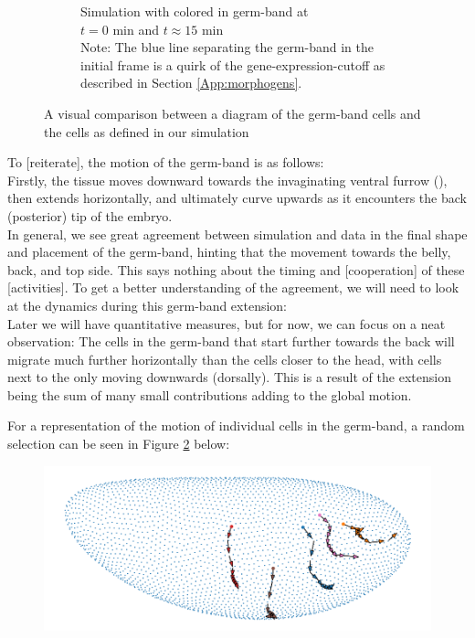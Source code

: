 \begin{figure}[H]
\begin{subfigure}[b]{0.61\textwidth}
    \caption{Simulation with colored in germ-band at \\ $t = 0 \text{ min}$ and $t \approx 15 \text{ min}$\\Note: The blue line separating the germ-band in the initial frame is a quirk of the gene-expression-cutoff as described in Section \ref{App:morphogens}.}
    \end{subfigure}
    \caption{A visual comparison between a diagram of the germ-band cells and the cells as defined in our simulation\\}
    \label{fig:germbandCompare}
\end{figure}



To [reiterate], the motion of the germ-band is as follows:\\Firstly, the tissue moves downward towards the invaginating ventral furrow (), then extends horizontally, and ultimately curve upwards as it encounters the back (posterior) tip of the embryo.\\

In general, we see great agreement between simulation and data in the final shape and placement of the germ-band, hinting that the movement towards the belly, back, and top side. This says nothing about the timing and [cooperation] of these [activities]. To get a better understanding of the agreement, we will need to look at the dynamics during this germ-band extension:\\

Later we will have quantitative measures, but for now, we can focus on a neat observation: The cells in the germ-band that start further towards the back will migrate much further horizontally than the cells closer to the head, with cells next to the  only moving downwards (dorsally).  This is a result of the extension being the sum of many small contributions adding to the global motion. 

For a representation of the motion of individual cells in the germ-band, a random selection can be seen in Figure \ref{fig:GBMovements} below:
\begin{figure}[H]
    \centering
    \includegraphics[width=1\linewidth]{chapters/Results/figures/movements.png}
    \caption{}
    \label{fig:GBMovements}
\end{figure}


